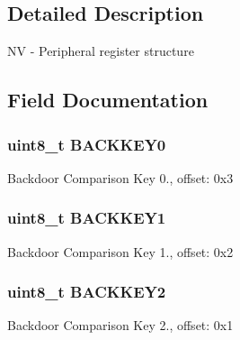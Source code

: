 \subsection{Detailed Description}
N\+V -\/ Peripheral register structure 

\subsection{Field Documentation}
\hypertarget{struct_n_v___mem_map_a280660e11655c843a6fae9d889b5cc41}{}
\subsubsection[{B\+A\+C\+K\+K\+E\+Y0}]{\setlength{\rightskip}{0pt plus 5cm}uint8\+\_\+t B\+A\+C\+K\+K\+E\+Y0}\label{struct_n_v___mem_map_a280660e11655c843a6fae9d889b5cc41}
Backdoor Comparison Key 0., offset\+: 0x3 \hypertarget{struct_n_v___mem_map_a4bc4d2132eecad7475c6f8c0147478ff}{}
\subsubsection[{B\+A\+C\+K\+K\+E\+Y1}]{\setlength{\rightskip}{0pt plus 5cm}uint8\+\_\+t B\+A\+C\+K\+K\+E\+Y1}\label{struct_n_v___mem_map_a4bc4d2132eecad7475c6f8c0147478ff}
Backdoor Comparison Key 1., offset\+: 0x2 \hypertarget{struct_n_v___mem_map_a89ac3c4b5fa925e08ed0ea6cf1461114}{}
\subsubsection[{B\+A\+C\+K\+K\+E\+Y2}]{\setlength{\rightskip}{0pt plus 5cm}uint8\+\_\+t B\+A\+C\+K\+K\+E\+Y2}\label{struct_n_v___mem_map_a89ac3c4b5fa925e08ed0ea6cf1461114}
Backdoor Comparison Key 2., offset\+: 0x1 \hypertarget{struct_n_v___mem_map_a3f146f3eeb245a4d378e7e6a2f234349}{}
